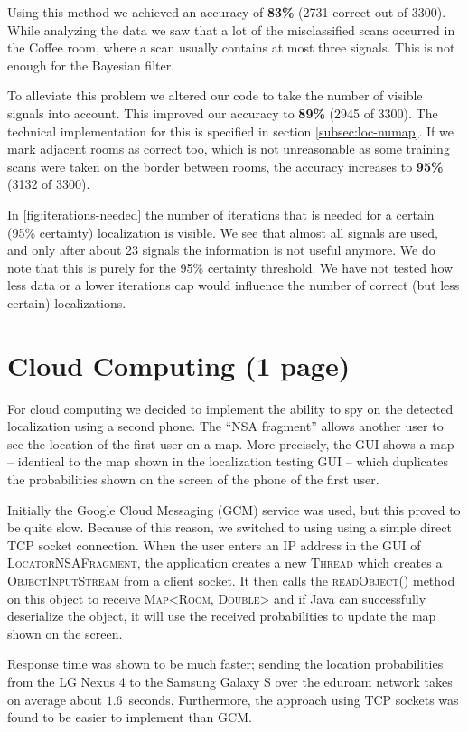 \documentclass[a4paper,10pt,twoside]{IEEEtran}
\begin{document}
Using this method we achieved an accuracy of \textbf{83\%} (2731 correct out of 3300).
While analyzing the data we saw that a lot of the misclassified scans occurred in the Coffee room,
where a scan usually contains at most three signals. This is not enough for the Bayesian filter.

To alleviate this problem we altered our code to take the number of visible signals into account.
This improved our accuracy to \textbf{89\%} (2945 of 3300).
The technical implementation for this is specified in section \ref{subsec:loc-numap}.
If we mark adjacent rooms as correct too, which is not unreasonable as some training scans were taken on the border between rooms, the accuracy increases to \textbf{95\%} (3132 of 3300).

In \autoref{fig:iterations-needed} the number of iterations that is needed for a certain (95\% certainty) localization is visible.
We see that almost all signals are used, and only after about 23 signals the information is not useful anymore.
We do note that this is purely for the 95\% certainty threshold.
We have not tested how less data or a lower iterations cap would influence the number of correct (but less certain) localizations.

\section{Cloud Computing (1 page)}
\label{sec:cloud-computing}
For cloud computing we decided to implement the ability to spy on the detected localization using a second phone. The ``NSA fragment'' allows another user to see the location of the first user on a map. More precisely, the GUI shows a map -- identical to the map shown in the localization testing GUI -- which duplicates the probabilities shown on the screen of the phone of the first user.

Initially the Google Cloud Messaging (GCM) service was used, but this proved to be quite slow. Because of this reason, we switched to using using a simple direct TCP socket connection. When the user enters an IP address in the GUI of \textsc{LocatorNSAFragment}, the application creates a new \textsc{Thread} which creates a \textsc{ObjectInputStream} from a client socket. It then calls the \textsc{readObject()} method on this object to receive \textsc{Map<Room, Double>} and if Java can successfully deserialize the object, it will use the received probabilities to update the map shown on the screen.

Response time was shown to be much faster; sending the location probabilities from the LG Nexus 4 to the Samsung Galaxy S over the eduroam network takes on average about $1.6$~seconds. Furthermore, the approach using TCP sockets was found to be easier to implement than GCM.
\end{document}
